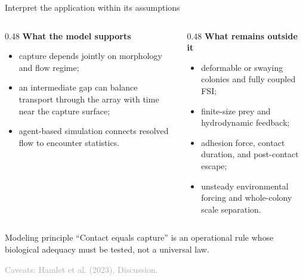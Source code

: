 \documentclass[aspectratio=169,11pt]{beamer}
\newcommand{\sourcecredit}[1]{\vfill\hfill{\tiny\textcolor{DarkGray}{#1}}}
\begin{document}
\begin{frame}{Interpret the application within its assumptions}
\begin{columns}[T,onlytextwidth]
  \begin{column}{0.48\textwidth}
    \textbf{What the model supports}
    \begin{itemize}
      \item capture depends jointly on morphology and flow regime;
      \item an intermediate gap can balance transport through the array with time near the capture surface;
      \item agent-based simulation connects resolved flow to encounter statistics.
    \end{itemize}
  \end{column}
  \begin{column}{0.48\textwidth}
    \textbf{What remains outside it}
    \begin{itemize}
      \item deformable or swaying colonies and fully coupled FSI;
      \item finite-size prey and hydrodynamic feedback;
      \item adhesion force, contact duration, and post-contact escape;
      \item unsteady environmental forcing and whole-colony scale separation.
    \end{itemize}
  \end{column}
\end{columns}
\begin{block}{Modeling principle}
``Contact equals capture'' is an operational rule whose biological adequacy must be tested, not a universal law.
\end{block}
\sourcecredit{Caveats: Hamlet et al. (2023), Discussion.}
\end{frame}
\end{document}
